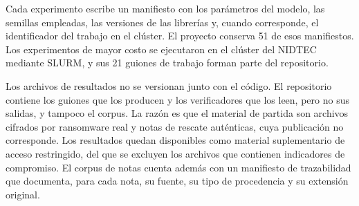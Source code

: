 Cada experimento escribe un manifiesto con los parámetros del modelo, las semillas empleadas, las versiones de las librerías y, cuando corresponde, el identificador del trabajo en el clúster. El proyecto conserva 51 de esos manifiestos. Los experimentos de mayor costo se ejecutaron en el clúster del NIDTEC mediante SLURM, y sus 21 guiones de trabajo forman parte del repositorio.

Los archivos de resultados no se versionan junto con el código. El repositorio contiene los guiones que los producen y los verificadores que los leen, pero no sus salidas, y tampoco el corpus. La razón es que el material de partida son archivos cifrados por ransomware real y notas de rescate auténticas, cuya publicación no corresponde. Los resultados quedan disponibles como material suplementario de acceso restringido, del que se excluyen los archivos que contienen indicadores de compromiso. El corpus de notas cuenta además con un manifiesto de trazabilidad que documenta, para cada nota, su fuente, su tipo de procedencia y su extensión original.
